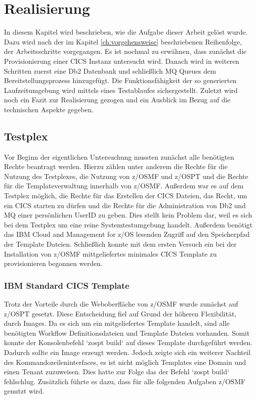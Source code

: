 \chapter{Realisierung}\label{ch:realisierung}
In diesem Kapitel wird beschrieben, wie die Aufgabe dieser Arbeit gelöst wurde.
Dazu wird nach der im Kapitel \ref{ch:vorgehensweise} beschriebenen Reihenfolge, der Arbeitsschritte vorgegangen.
Es ist nochmal zu erwähnen, dass zunächst die Provisionierung einer CICS Instanz untersucht wird.
Danach wird in weiteren Schritten zuerst eine Db2 Datenbank und schließlich MQ Queues dem Bereitstellungsprozess hinzugefügt.
Die Funktionsfähigkeit der so generierten Laufzeitumgebung wird mittels eines Testablaufes sichergestellt.
Zuletzt wird noch ein Fazit zur Realisierung gezogen und ein Ausblick im Bezug auf die technischen Aspekte gegeben.

\section{Testplex}
Vor Beginn der eigentlichen Untersuchung mussten zunächst alle benötigten Rechte beantragt werden.
Hierzu zählen unter anderem die Rechte für die Nutzung des Testplexes, die Nutzung von z/OSMF und z/OSPT und die Rechte für die Templateverwaltung innerhalb von z/OSMF.
Außerdem war es auf dem Testplex möglich, die Rechte für das Erstellen der CICS Dateien, das Recht, um ein CICS starten zu dürfen und die Rechte für die Administration von Db2 und MQ einer persönlichen UserID zu geben.
Dies stellt kein Problem dar, weil es sich bei dem Testplex um eine reine Systemtestumgebung handelt.
Außerdem benötigt das IBM Cloud and Management for z/OS lesenden Zugriff auf den Speicherpfad der Template Dateien.
Schließlich konnte mit dem ersten Versuch ein bei der Installation von z/OSMF mittgeliefertes minimales CICS Template zu provisionieren begonnen werden.

\subsection{IBM Standard CICS Template}
Trotz der Vorteile durch die Weboberfläche von z/OSMF wurde zunächst auf z/OSPT gesetzt.
Diese Entscheidung fiel auf Grund der höheren Flexibilität, durch Images.
Da es sich um ein mitgeliefertes Template handelt, sind alle benötigten Workflow Definitionsdateien und Template Dateien vorhanden.
Somit konnte der Konsolenbefehl `zospt build` auf dieses Template durchgeführt werden.
Dadurch sollte ein Image erzeugt werden.
Jedoch zeigte sich ein weiterer Nachteil des Kommandozeileninterfaces, es ist nicht möglich Templates eine Domain und einen Tenant zuzuweisen.
Dies hatte zur Folge das der Befehl `zospt build` fehlschlug.
Zusätzlich führte es dazu, dass für alle folgenden Aufgaben z/OSMF genutzt wird.

